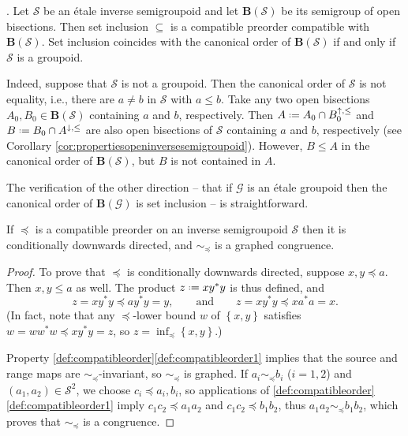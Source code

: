 \begin{example}\label{ex:setorderofbisections}.
    Let $\mathcal{S}$ be an étale inverse semigroupoid and let $\mathbf{B}(\mathcal{S})$ be its semigroup of open bisections. Then set inclusion $\subseteq$ is a compatible preorder compatible with $\mathbf{B}(\mathcal{S})$. Set inclusion coincides with the canonical order of $\mathbf{B}(\mathcal{S})$ if and only if $\mathcal{S}$ is a groupoid.
    
    Indeed, suppose that $\mathcal{S}$ is not a groupoid. Then the canonical order of $\mathcal{S}$ is not equality, i.e., there are $a\neq b$ in $\mathcal{S}$ with $a\leq b$. Take any two open bisections $A_0,B_0\in\mathbf{B}(\mathcal{S})$ containing $a$ and $b$, respectively. Then $A\defeq A_0\cap B_0^{\uparrow,\leq}$ and $B\defeq B_0\cap A^{\downarrow,\leq}$ are also open bisections of $\mathcal{S}$ containing $a$ and $b$, respectively (see Corollary \ref{cor:propertiesopeninversesemigroupoid}). However, $B\leq A$ in the canonical order of $\mathbf{B}(\mathcal{S})$, but $B$ is not contained in $A$.
    
    The verification of the other direction -- that if $\mathcal{G}$ is an étale groupoid then the canonical order of $\mathbf{B}(\mathcal{G})$ is set inclusion -- is straightforward.
\end{example}

\begin{lemma}\label{lem:relation.of.germs.is.a.graphed.congruence}
If $\preceq$ is a compatible preorder on an inverse semigroupoid $\mathcal{S}$ then it is conditionally downwards directed, and $\sim_{\preceq}$ is a graphed congruence.
\end{lemma}
\begin{proof}
    To prove that $\preceq$ is conditionally downwards directed, suppose $x,y\preceq a$. Then $x,y\leq a$ as well. The product $z\defeq xy^*y$ is thus defined, and
    \[z=xy^*y\preceq ay^*y=y,\qquad\text{and}\qquad z=xy^*y\preceq xa^*a=x.\]
    (In fact, note that any $\preceq$-lower bound $w$ of $\left\{x,y\right\}$ satisfies $w=ww^*w\preceq xy^*y=z$, so $z=\inf_{\preceq}\left\{x,y\right\}$.)
    
    Property \ref{def:compatibleorder}\ref{def:compatibleorder1} implies that the source and range maps are $\sim_{\preceq}$-invariant, so $\sim_{\preceq}$ is graphed. If $a_i\sim_{\preceq} b_i$ ($i=1,2$) and $(a_1,a_2)\in\mathcal{S}^2$, we choose $c_i\preceq a_i,b_i$, so applications of \ref{def:compatibleorder}\ref{def:compatibleorder1} imply $c_1c_2\preceq a_1a_2$ and $c_1c_2\preceq b_1b_2$, thus $a_1a_2\sim_{\preceq} b_1b_2$, which proves that $\sim_{\preceq}$ is a congruence.\qedhere
\end{proof}

